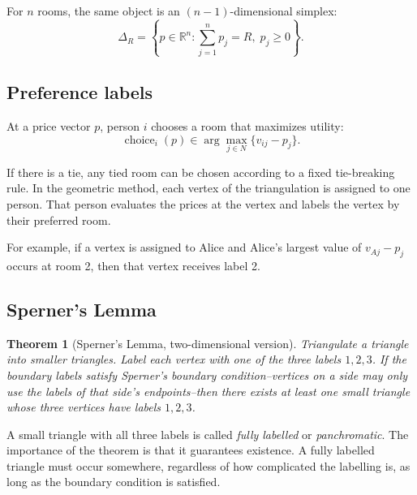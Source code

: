\documentclass[11pt]{article}
\newtheorem{theorem}{Theorem}
\begin{document}
For $n$ rooms, the same object is an $(n-1)$-dimensional simplex:
\begin{equation}
    \Delta_R=\left\{p\in\mathbb{R}^n: \sum_{j=1}^{n}p_j=R,\;p_j\geq 0\right\}.
\end{equation}

\subsection{Preference labels}

At a price vector $p$, person $i$ chooses a room that maximizes utility:
\begin{equation}
    \operatorname{choice}_i(p)\in \arg\max_{j\in N}\{v_{ij}-p_j\}.
    \label{eq:choice}
\end{equation}

If there is a tie, any tied room can be chosen according to a fixed tie-breaking rule. In the geometric method, each vertex of the triangulation is assigned to one person. That person evaluates the prices at the vertex and labels the vertex by their preferred room.

For example, if a vertex is assigned to Alice and Alice's largest value of $v_{Aj}-p_j$ occurs at room 2, then that vertex receives label 2.

\subsection{Sperner's Lemma}

\begin{theorem}[Sperner's Lemma, two-dimensional version]
Triangulate a triangle into smaller triangles. Label each vertex with one of the three labels $1,2,3$. If the boundary labels satisfy Sperner's boundary condition--vertices on a side may only use the labels of that side's endpoints--then there exists at least one small triangle whose three vertices have labels $1,2,3$.
\end{theorem}

A small triangle with all three labels is called \emph{fully labelled} or \emph{panchromatic}. The importance of the theorem is that it guarantees existence. A fully labelled triangle must occur somewhere, regardless of how complicated the labelling is, as long as the boundary condition is satisfied.
\end{document}
